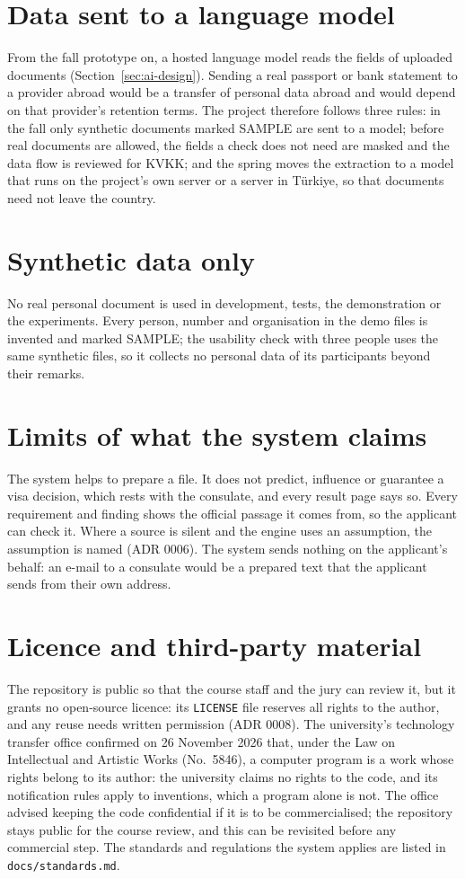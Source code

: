 \section{Data sent to a language model}
From the fall prototype on, a hosted language model reads the fields of uploaded documents
(Section~\ref{sec:ai-design}). Sending a real passport or bank statement to a provider abroad
would be a transfer of personal data abroad and would depend on that provider's retention terms.
The project therefore follows three rules: in the fall only synthetic documents marked SAMPLE are
sent to a model; before real documents are allowed, the fields a check does not need are masked
and the data flow is reviewed for KVKK; and the spring moves the extraction to a model that runs
on the project's own server or a server in Türkiye, so that documents need not leave the country.

\section{Synthetic data only}
No real personal document is used in development, tests, the demonstration or the experiments.
Every person, number and organisation in the demo files is invented and marked SAMPLE; the
usability check with three people uses the same synthetic files, so it collects no personal data
of its participants beyond their remarks.

\section{Limits of what the system claims}
The system helps to prepare a file. It does not predict, influence or guarantee a visa decision,
which rests with the consulate, and every result page says so. Every requirement and finding
shows the official passage it comes from, so the applicant can check it. Where a source is
silent and the engine uses an assumption, the assumption is named (ADR 0006). The system sends
nothing on the applicant's behalf: an e-mail to a consulate would be a prepared text that the
applicant sends from their own address.

\section{Licence and third-party material}
The repository is public so that the course staff and the jury can review it, but it grants no
open-source licence: its \texttt{LICENSE} file reserves all rights to the author, and any reuse
needs written permission (ADR 0008). The university's technology transfer office confirmed on
26 November 2026 that, under the Law on Intellectual and Artistic Works (No.~5846), a computer
program is a work whose rights belong to its author: the university claims no rights to the code,
and its notification rules apply to inventions, which a program alone is not. The office advised
keeping the code confidential if it is to be commercialised; the repository stays public for the
course review, and this can be revisited before any commercial step. The standards and regulations the system applies are listed in
\texttt{docs/standards.md}.

